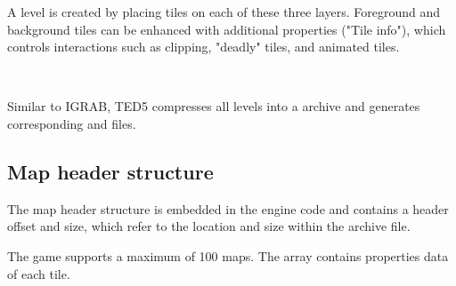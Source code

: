 \documentclass[book.tex]{subfiles}
\begin{document}
A level is created by placing tiles on each of these three layers. Foreground and background tiles can be enhanced with additional properties ("Tile info"), which controls interactions such as clipping, "deadly" tiles, and animated tiles. \\

\par
{}\\
 
\par
Similar to IGRAB, TED5 compresses all levels into a  archive and generates corresponding  and  files.\\

 
\subsection{Map header structure}
The map header structure is embedded in the engine code and contains a header offset and size, which refer to the location and size within the  archive file. \\

\par
\begin{minipage}{\textwidth}
 \par
 \end{minipage}

The game supports a maximum of 100 maps. The  array contains properties data of each tile.
 
\end{document}

